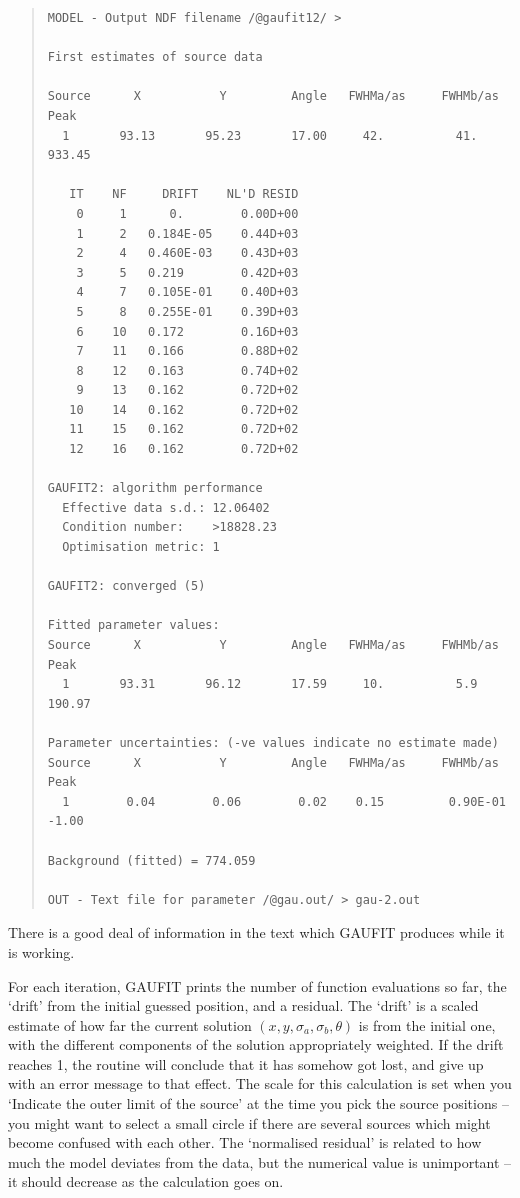 \documentclass[twoside,11pt]{article}
\newenvironment{myquote}{\begin{quote}\begin{small}}{\end{small}\end{quote}}
\begin{document}
\begin{myquote}
\begin{verbatim}
MODEL - Output NDF filename /@gaufit12/ > 

First estimates of source data

Source      X           Y         Angle   FWHMa/as     FWHMb/as         Peak
  1       93.13       95.23       17.00     42.          41.           933.45

   IT    NF     DRIFT    NL'D RESID
    0     1      0.        0.00D+00
    1     2   0.184E-05    0.44D+03
    2     4   0.460E-03    0.43D+03
    3     5   0.219        0.42D+03
    4     7   0.105E-01    0.40D+03
    5     8   0.255E-01    0.39D+03
    6    10   0.172        0.16D+03
    7    11   0.166        0.88D+02
    8    12   0.163        0.74D+02
    9    13   0.162        0.72D+02
   10    14   0.162        0.72D+02
   11    15   0.162        0.72D+02
   12    16   0.162        0.72D+02

GAUFIT2: algorithm performance
  Effective data s.d.: 12.06402
  Condition number:    >18828.23
  Optimisation metric: 1

GAUFIT2: converged (5)

Fitted parameter values:
Source      X           Y         Angle   FWHMa/as     FWHMb/as         Peak
  1       93.31       96.12       17.59     10.          5.9           190.97

Parameter uncertainties: (-ve values indicate no estimate made)
Source      X           Y         Angle   FWHMa/as     FWHMb/as         Peak
  1        0.04        0.06        0.02    0.15         0.90E-01        -1.00

Background (fitted) = 774.059

OUT - Text file for parameter /@gau.out/ > gau-2.out
\end{verbatim}
\end{myquote}

There is a good deal of information in the text which GAUFIT produces
while it is working.

For each iteration, GAUFIT prints the number of function evaluations
so far, the `drift' from the initial guessed position, and a
residual.  The `drift' is a scaled estimate of how far the current
solution $(x,y,\sigma_a,\sigma_b,\theta)$ is from the initial one,
with the different components of the solution appropriately weighted.
If the drift reaches 1, the routine will conclude that it has somehow
got lost, and give up with an error message to that effect. The scale
for this calculation is set when you `Indicate the outer limit of the
source' at the time you pick the source positions -- you might want to
select a small circle if there are several sources which might become
confused with each other.  The `normalised residual' is related to how
much the model deviates from the data, but the numerical value is
unimportant -- it should decrease as the calculation goes on.
\end{document}
